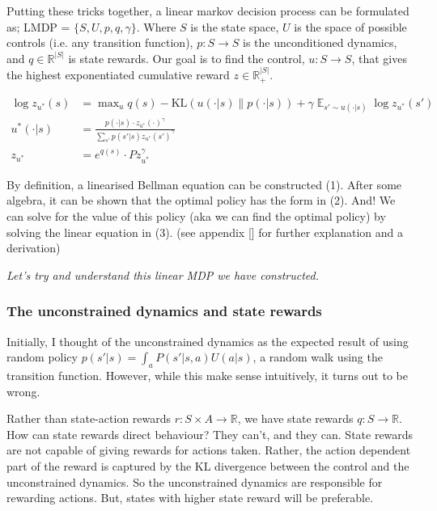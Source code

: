 

Putting these tricks together, a linear markov decision process can be formulated as;
LMDP = $\{S, U, p, q, \gamma\}$. Where $S$ is the state space, $U$ is the space of possible controls (i.e. any transition function),
$p: S \to S$ is the unconditioned dynamics, and $q \in \mathbb R^{|S|}$ is state rewards.
Our goal is to find the control, $u: S \to S$, that gives the highest exponentiated cumulative reward $z \in \mathbb R_+^{|S|}$.

\begin{align}
\log z_{u^{* }}(s) &= \mathop{\text{max}}_{u} q(s) - \text{KL}(u(\cdot| s) \parallel p(\cdot | s)) + \gamma \mathop{\mathbb E}_{s' \sim u(\cdot | s)} \log z_{u^{* }}(s') \tag{1}\\
u^{* }(\cdot | s) &= \frac{p(\cdot | s)\cdot z_{u^{* }}(\cdot)^{\gamma}}{\sum_{s'} p(s' | s) z_{u^{* }}(s')^{\gamma}} \tag{2}\\
z_{u^{* }} &= e^{q(s)}\cdot P z_{u^{* }}^{\gamma} \tag{3}
\end{align}

By definition, a linearised Bellman equation can be constructed (1). After some algebra,
it can be shown that the optimal policy has the form in (2).
And! We can solve for the value of this policy (aka we can find the optimal policy)
by solving the linear equation in (3). (see appendix [] for further explanation and a derivation)

\begin{displayquote}
\textit{Let's try and understand this linear MDP we have constructed.}
\end{displayquote}

\subsubsection{\color{red}The unconstrained dynamics and state rewards}

Initially, I thought of the unconstrained dynamics as the expected result of using random policy
$p(s' | s) = \int_a P(s' | s, a)U(a|s)$, a random walk using the transition function.
However, while this make sense intuitively, it turns out to be wrong.

Rather than state-action rewards $r: S \times A \to \mathbb R$, we have state rewards $q: S \to \mathbb R$.
How can state rewards direct behaviour? They can't, and they can. State rewards are not capable of giving rewards for actions taken.
Rather, the action dependent part of the reward is captured by the KL divergence between the control and the unconstrained dynamics.
So the unconstrained dynamics are responsible for rewarding actions.
But, states with higher state reward will be preferable.


